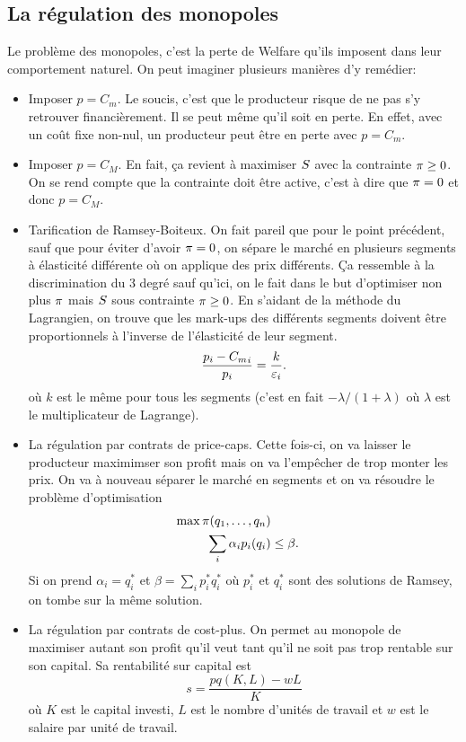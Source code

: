 \subsection{La régulation des monopoles}
Le problème des monopoles, c'est la perte de Welfare qu'ils imposent
dans leur comportement naturel.
On peut imaginer plusieurs manières d'y remédier:
\begin{itemize}
  \item Imposer $p = C_m$.
    Le soucis, c'est que le producteur risque de ne pas s'y retrouver
    financièrement. Il se peut même qu'il soit en perte.
    En effet, avec un coût fixe non-nul, un producteur peut être en perte
    avec $p = C_m$.
  \item Imposer $p = C_M$.
    En fait, ça revient à maximiser $S$ avec la contrainte
    $\pi \geq 0$.
    On se rend compte que la contrainte doit être active, c'est à dire que
    $\pi = 0$ et donc $p = C_M$.
  \item Tarification de Ramsey-Boiteux.
    On fait pareil que pour le point précédent, sauf que pour éviter
    d'avoir $\pi = 0$,
    on sépare le marché en plusieurs segments à élasticité différente
    où on applique des prix différents.
    Ça ressemble à la discrimination du 3\ieme{} degré sauf qu'ici,
    on le fait dans le but d'optimiser non plus $\pi$ mais $S$
    sous contrainte $\pi \geq 0$.
    En s'aidant de la méthode du Lagrangien, on trouve que les
    mark-ups des différents segments doivent être proportionnels à l'inverse
    de l'élasticité de leur segment.
    \[ \frac{p_i - {C_m}_i}{p_i} = \frac{k}{\varepsilon_i}. \]
    où $k$ est le même pour tous les segments (c'est en fait
    $-\lambda/(1+\lambda)$ où $\lambda$ est le multiplicateur de Lagrange).
  \item La régulation par contrats de price-caps.
    Cette fois-ci, on va laisser le producteur maximimser son profit
    mais on va l'empêcher de trop monter les prix.
    On va à nouveau séparer le marché en segments et on va résoudre
    le problème d'optimisation
    \begin{align*}
      \max \pi(q_1,\ldots,q_n)\\
      \sum_i \alpha_ip_i(q_i) & \leq \beta.
    \end{align*}
    Si on prend $\alpha_i = q_i^*$ et $\beta = \sum_i p_i^*q_i^*$
    où $p_i^*$ et $q_i^*$ sont des solutions de Ramsey, on tombe
    sur la même solution.
  \item La régulation par contrats de cost-plus.
    On permet au monopole de maximiser autant son profit qu'il veut
    tant qu'il ne soit pas trop rentable sur son capital.
    Sa rentabilité sur capital est
    \[ s = \frac{pq(K, L) - wL}{K} \]
    où $K$ est le capital investi, $L$ est le nombre d'unités de travail
    et $w$ est le salaire par unité de travail.


\end{itemize}
